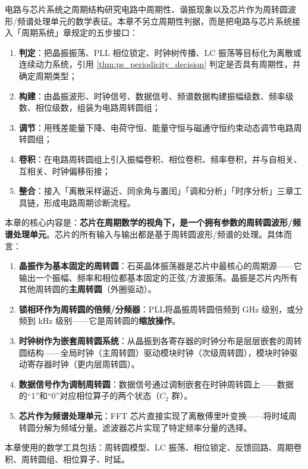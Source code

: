 \begin{remark}\label{rem:circuit_five_steps_positioning}
电路与芯片系统之周期结构研究电路中周期性、谐振现象以及芯片作为周转圆波形/频谱处理单元的数学表征。本章不另立周期性判据，而是把电路与芯片系统接入「周期系统」章规定的五步接口：
\begin{enumerate}[label=(\arabic*)]
    \item \textbf{判定}：把晶振振荡、PLL 相位锁定、时钟树传播、LC 振荡等目标化为离散或连续动力系统，引用 \cref{thm:ps_periodicity_decision} 判定是否具有周期性，并确定周期类型；
    \item \textbf{构建}：由晶振波形、时钟信号、数据信号、频谱数据构建振幅级数、频率级数、相位级数，组装为电路周转圆组；
    \item \textbf{调节}：用残差能量下降、电荷守恒、能量守恒与磁通守恒约束动态调节电路周转圆组；
    \item \textbf{卷积}：在电路周转圆组上引入振幅卷积、相位卷积、频率卷积，并与自相关、互相关、时钟偏移衔接；
    \item \textbf{整合}：接入「离散采样逼近、同余角与置闰」「调和分析」「时序分析」三章工具链，形成电路周期诊断流程。
\end{enumerate}
本章的核心内容是：\textbf{芯片在周期数学的视角下，是一个拥有参数的周转圆波形/频谱处理单元}。芯片的所有输入与输出都是基于周转圆波形/频谱的处理。具体而言：
\begin{enumerate}[label=(\arabic*)]
    \item \textbf{晶振作为基本固定的周转圆}：石英晶体振荡器是芯片中最核心的周期源——它输出一个振幅、频率和相位都基本固定的正弦/方波振荡。晶振是芯片内所有其他周转圆的\textbf{主周转圆}（外圈驱动）。
    \item \textbf{锁相环作为周转圆的倍频/分频器}：PLL将晶振周转圆倍频到 GHz 级别，或分频到 kHz 级别——它是周转圆的\textbf{缩放操作}。
    \item \textbf{时钟树作为嵌套周转圆系统}：从晶振到各寄存器的时钟分布是层层嵌套的周转圆结构——全局时钟（主周转圆）驱动模块时钟（次级周转圆），模块时钟驱动寄存器时钟（更内层周转圆）。
    \item \textbf{数据信号作为调制周转圆}：数据信号通过调制嵌套在时钟周转圆上——数据的“1”和“0”对应相位算子的两个状态（$C_2$ 群）。
    \item \textbf{芯片作为频谱处理单元}：FFT 芯片直接实现了离散傅里叶变换——将时域周转圆分解为频域分量。滤波器芯片实现了特定频率分量的选择。
\end{enumerate}
本章使用的数学工具包括：周转圆模型、LC 振荡、相位锁定、反馈回路、周期卷积、周转圆组、相位算子、时延。
\end{remark}

